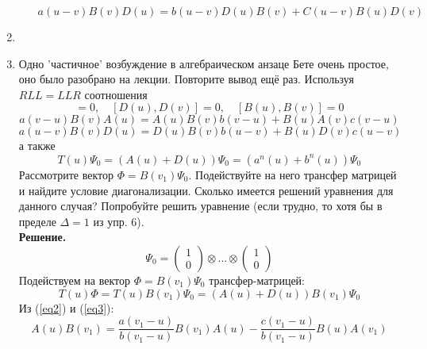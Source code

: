 \documentclass[12pt]{article}
\theoremstyle{definition}
\begin{document}
\begin{enumerate}
\begin{itemize}
        \begin{equation}
            \boxed{a(u-v)B(v)D(u)=b(u-v)D(u)B(v)+C(u-v)B(u)D(v)}
        \end{equation}
    \end{itemize}
    \item
    \item Одно 'частичное' возбуждение в алгебраическом анзаце Бете очень простое, оно было разобрано на лекции. Повторите вывод ещё раз. Используя $RLL=LLR$ соотношения
    \begin{equation}
        [A(u),A(v)]=0,\quad [D(u),D(v)]=0,\quad [B(u),B(v)]=0
    \end{equation}
    \begin{equation}\label{eq2}
        a(v-u)B(v)A(u)=A(u)B(v)b(v-u)+B(u)A(v)c(v-u)
    \end{equation}
    \begin{equation}\label{eq3}
        a(u-v)B(v)D(u)=D(u)B(v)b(u-v)+B(u)D(v)c(u-v)
    \end{equation}
    а также
    \begin{equation}
        T(u)\Psi_0=(A(u)+D(u))\Psi_0=(a^n(u)+b^n(u))\Psi_0
    \end{equation}
    Рассмотрите вектор $\Phi=B(v_1)\Psi_0$. Подействуйте на него трансфер матрицей и найдите условие диагонализации. Сколько имеется решений уравнения для данного случая? Попробуйте решить уравнение (если трудно, то хотя бы в пределе $\Delta=1$ из упр. 6).\\
    \textbf{Решение.}
    \begin{equation}
        \Psi_0=\begin{pmatrix}
            1\\0
        \end{pmatrix}\otimes...\otimes\begin{pmatrix}
            1\\0
        \end{pmatrix}
    \end{equation}
    Подействуем на вектор $\Phi=B(v_1)\Psi_0$ трансфер-матрицей:
    \begin{equation}
        T(u)\Phi=T(u)B(v_1)\Psi_0=(A(u)+D(u))B(v_1)\Psi_0
    \end{equation}
    Из (\ref{eq2}) и (\ref{eq3}):
    \begin{equation}
        A(u)B(v_1)=\frac{a(v_1-u)}{b(v_1-u)}B(v_1)A(u)-\frac{c(v_1-u)}{b(v_1-u)}B(u)A(v_1)
    \end{equation}
    \begin{equation}

\end{equation}
\end{enumerate}
\end{document}
